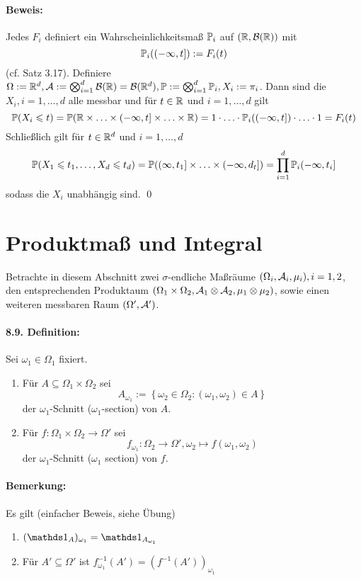 \documentclass[11pt]{report}
\begin{document}
\paragraph{Beweis:}Jedes $F_i$ definiert ein Wahrscheinlichkeitsma\ss{} $\mathbb{P}_i$ auf $(\mathbb{R},\mathcal{B}(\mathbb{R}))$ mit
$$\mathbb{P}_i((-\infty,t]):=F_i(t)$$
(cf. Satz 3.17). Definiere $\Omega:=\mathbb{R}^d,\mathcal{A}:=\bigotimes_{i=1}^d\mathcal{B}(\mathbb{R})=\mathcal{B}(\mathbb{R}^d),\mathbb{P}:=\bigotimes_{i=1}^d\mathbb{P}_i,X_i:=\pi_i$. Dann sind die $X_i,i=1,\hdots,d$ alle messbar und f\"ur $t\in\mathbb{R}$ und $i=1,\hdots,d$ gilt
$$\mathbb{P}(X_i\leqslant t)=\mathbb{P}(\mathbb{R}\times\hdots\times(-\infty,t]\times\hdots\times\mathbb{R})=1\cdot\hdots\cdot\mathbb{P}_i((-\infty,t])\cdot\hdots\cdot1=F_i(t)$$
Schlie\ss{}lich gilt f\"ur $t\in\mathbb{R}^d$ und $i=1,\hdots,d$
$$\mathbb{P}(X_1\leqslant t_1,\hdots,X_d\leqslant t_d)=\mathbb{P}((\infty,t_1]\times\hdots\times(-\infty,d_t])=\prod_{i=1}^d\mathbb{P}_i(-\infty,t_i]$$
sodass die $X_i$ unabh\"angig sind. \qed

\section*{Produktma\ss{} und Integral}
Betrachte in diesem Abschnitt zwei $\sigma$-endliche Ma\ss{}r\"aume $(\Omega_i,\mathcal{A}_i,\mu_i),i=1,2$, den entsprechenden Produktaum $(\Omega_1\times\Omega_2,\mathcal{A}_1\otimes\mathcal{A}_2,\mu_1\otimes\mu_2)$, sowie einen weiteren messbaren Raum $(\Omega',\mathcal{A}')$.

\paragraph{8.9. Definition:}Sei $\omega_1\in\Omega_1$ fixiert.
\begin{enumerate}[label=(\roman*)]
    \item F\"ur $A\subseteq\Omega_1\times\Omega_2$ sei
    $$A_{\omega_1}:=\left\{\omega_2\in\Omega_2:(\omega_1,\omega_2)\in A\right\}$$
    der $\omega_1$-Schnitt ($\omega_1$-section) von $A$.
    \item F\"ur $f:\Omega_1\times\Omega_2\to\Omega'$ sei
    $$f_{\omega_1}:\Omega_2\to\Omega',\omega_2\mapsto f(\omega_1,\omega_2)$$
    der $\omega_1$-Schnitt ($\omega_1$ section) von $f$.
\end{enumerate}

\paragraph{Bemerkung:}Es gilt (einfacher Beweis, siehe \"Ubung)
\begin{enumerate}[label=(\roman*)]
    \item $(\ind{A})_{\omega_1}=\ind{A_{\omega_1}}$
    \item F\"ur $A'\subseteq\Omega'$ ist $f^{-1}_{\omega_1}(A')=(f^{-1}(A'))_{\omega_1}$
\end{enumerate}
\end{document}
